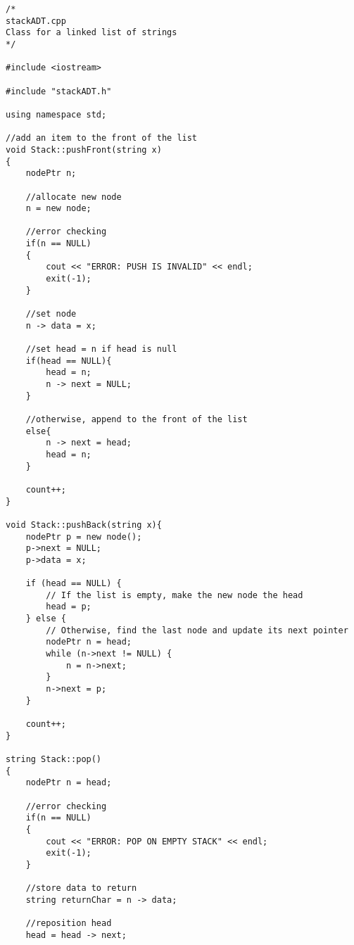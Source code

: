 
\begin{lstlisting}[style=cppstyle, caption={stackADT.cpp}]
/*
stackADT.cpp
Class for a linked list of strings
*/

#include <iostream>

#include "stackADT.h"

using namespace std;

//add an item to the front of the list
void Stack::pushFront(string x)
{
    nodePtr n;

    //allocate new node
    n = new node;
    
    //error checking
    if(n == NULL)
    {
        cout << "ERROR: PUSH IS INVALID" << endl;
        exit(-1);
    }

    //set node
    n -> data = x;

    //set head = n if head is null
    if(head == NULL){
        head = n;
        n -> next = NULL;
    }

    //otherwise, append to the front of the list
    else{
        n -> next = head;
        head = n;
    }

    count++;
}

void Stack::pushBack(string x){
    nodePtr p = new node();
    p->next = NULL;
    p->data = x;

    if (head == NULL) {
        // If the list is empty, make the new node the head
        head = p;
    } else {
        // Otherwise, find the last node and update its next pointer
        nodePtr n = head;
        while (n->next != NULL) {
            n = n->next;
        }
        n->next = p;
    }

    count++;
}

string Stack::pop()
{
    nodePtr n = head;

    //error checking
    if(n == NULL)
    {
        cout << "ERROR: POP ON EMPTY STACK" << endl;
        exit(-1);
    }

    //store data to return
    string returnChar = n -> data;

    //reposition head
    head = head -> next;


\end{lstlisting}

